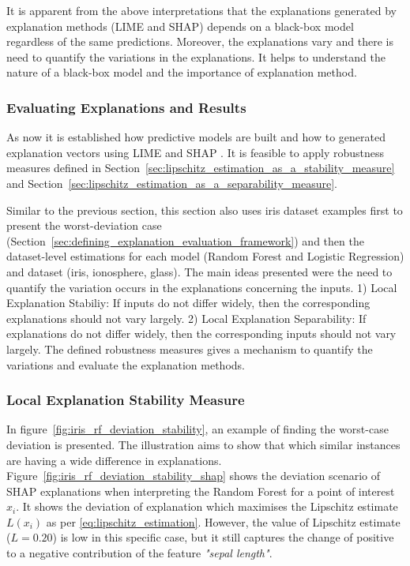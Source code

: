 \documentclass[english]{tktltiki2}
\theoremstyle{definition}
\theoremstyle{remark}
\begin{document}
It is apparent from the above interpretations that the explanations generated by explanation methods (LIME and SHAP) depends on a black-box model regardless of the same predictions. Moreover, the explanations vary and there is need to quantify the variations in the explanations. It helps to understand the nature of a black-box model and the importance of explanation method.

\subsubsection{Evaluating Explanations and Results}\label{sec:evaluating_explanations_and_results_part1}
As now it is established how predictive models are built and how to generated explanation vectors using LIME \citep{ribeiro2016should} and SHAP \citep{lundberg2017unified}. It is feasible to apply robustness measures defined in Section~\ref{sec:lipschitz_estimation_as_a_stability_measure} \citep{alvarez2018robustness} and Section~\ref{sec:lipschitz_estimation_as_a_separability_measure}.

Similar to the previous section, this section also uses iris dataset examples first to present the worst-deviation case (Section~\ref{sec:defining_explanation_evaluation_framework}) and then the dataset-level estimations for each model (Random Forest and Logistic Regression) and dataset (iris, ionosphere, glass).
The main ideas presented were the need to quantify the variation occurs in the explanations concerning the inputs. 1) Local Explanation Stabiliy: If inputs do not differ widely, then the corresponding explanations should not vary largely. 2) Local Explanation Separability: If explanations do not differ widely, then the corresponding inputs should not vary largely. The defined robustness measures gives a mechanism to quantify the variations and evaluate the explanation methods.

\subsubsection*{Local Explanation Stability Measure}
In figure~\ref{fig:iris_rf_deviation_stability}, an example of finding the worst-case deviation is presented. The illustration aims to show that which similar instances are having a wide difference in explanations.  Figure~\ref{fig:iris_rf_deviation_stability_shap} shows the deviation scenario of SHAP explanations when interpreting the Random Forest for a point of interest $x_i$. It shows the deviation of explanation which maximises the Lipschitz estimate $L(x_i)$ as per \eqref{eq:lipschitz_estimation}. However, the value of Lipschitz estimate ($L=0.20$) is low in this specific case, but it still captures the change of positive to a negative contribution of the feature \textit{"sepal length"}.
\end{document}

